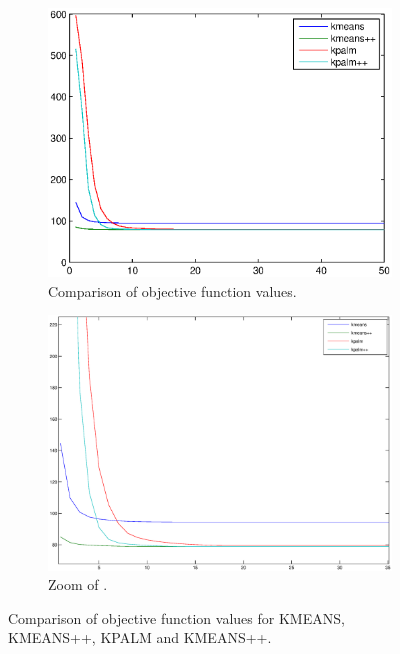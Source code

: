 \documentclass[12pt]{article}
\numberwithin{equation}{section}
\begin{document}

\begin{figure}[ht]
    \centering
    \begin{subfigure}[b]{0.6\textwidth}
        \includegraphics[width=\textwidth]{psi_algs_comparison2}
        \caption{Comparison of objective function values.}
        \label{fig:algs_psi_comp_A}
    \end{subfigure}
    \begin{subfigure}[b]{0.6\textwidth}
        \includegraphics[width=\textwidth]{psi_algs_comparison2_zoom}
        \caption{Zoom of .}
        \label{fig:algs_psi_comp_B}
    \end{subfigure}
    \caption{Comparison of objective function values for KMEANS, KMEANS++, KPALM and KMEANS++.} \label{fig:algs_psi_comp}
\end{figure}
\end{document}
